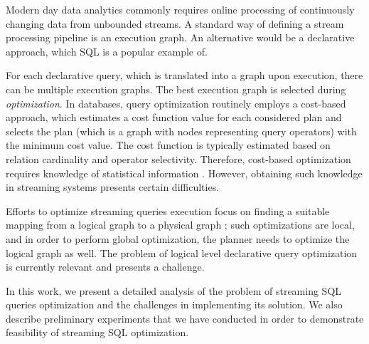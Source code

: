 \label {fs-optimization-introduction}

Modern day data analytics commonly requires online processing of continuously changing data from unbounded streams. A standard way of defining a stream processing pipeline is an execution graph. An alternative would be a declarative approach, which SQL is a popular example of.

For each declarative query, which is translated into a graph upon execution, there can be multiple execution graphs. The best execution graph is selected during \textit{optimization}. In databases, query optimization routinely employs a cost-based approach, which estimates a cost function value for each considered plan and selects the plan (which is a graph with nodes representing query operators) with the minimum cost value. The cost function is typically estimated based on relation cardinality and operator selectivity. Therefore, cost-based optimization requires knowledge of statistical information \cite{Neumann2018optimization}. However, obtaining such knowledge in streaming systems presents certain difficulties.

Efforts to optimize streaming queries execution focus on finding a suitable mapping from a logical graph to a physical graph \cite{grulich2020grizzly, gedik2009code}; such optimizations are local, and in order to perform global optimization, the planner needs to optimize the logical graph as well. The problem of logical level declarative query optimization is currently relevant and presents a challenge.

In this work, we present a detailed analysis of the problem of streaming SQL queries optimization and the challenges in implementing its solution. We also describe preliminary experiments that we have conducted in order to demonstrate feasibility of streaming SQL optimization.  
